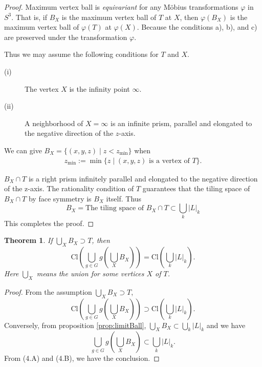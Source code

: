 \documentclass[suppldata, dvipdfmx]{interact}
\theoremstyle{plain}%
\newtheorem{theorem}{Theorem}[section]
\theoremstyle{definition}
\theoremstyle{remark}
\theoremstyle{problemstyle}
\begin{document}
\begin{proof}
 Maximum vertex ball is {\it equivariant} for any M\"obius transformations $\varphi$ in $S^3$. 
That is, if $B_X$ is the maximum vertex ball of $T$ at $X$, then $\varphi(B_X)$ is the maximum vertex ball of $\varphi(T)$ at $\varphi(X)$.
Because the conditions a), b), and c) are preserved under the transformation $\varphi$.

Thus we may assume the following conditions for $T$ and $X$.
 \begin{description}
  \item[(i)] The vertex $X$ is the infinity point $\infty$.
  \item[(ii)] A neighborhood of $X=\infty$ is an infinite prism, parallel and elongated to the negative direction of the $z$-axis.
 \end{description}
 We can give $B_X = \{(x, y, z) \mid z < z_\text{min}\}$ when
\begin{align*}
z_{\text{min}} := \min\{ z \mid (x, y, z) \text{ is a vertex of } T \}.
\end{align*}

 $B_X \cap T$ is a right prism infinitely parallel and elongated to the negative direction of the z-axis.  The rationality condition of $T$ guarantees that the tiling space of $B_X \cap T$ by face symmetry is $B_X$ itself.  Thus 
\[
B_X = \text{The tiling space of }B_X \cap T \subset \bigcup_k |L|_k
\]
This completes the proof.
\end{proof}

\begin{theorem}
If $\bigcup_{X} B_X \supset T$, then
\[
\text{Cl}\left(\bigcup_{g\in G}g(\bigcup_X {B_X})\right) = \text{Cl}\left(\bigcup_k |L|_k\right).
\]
Here $\bigcup_X$ means the union for some vertices $X$ of $T$.
\end{theorem}

\begin{proof}
  From the assumption $\bigcup_{X} B_X \supset T$, 
\[
\text{Cl}\left(\bigcup_{g\in G} g(\bigcup_X B_X)\right) 
\supset \text{Cl}(\bigcup_{k} |L|_k). \tag{4.A}
\]
 Conversely, from proposition \ref{prop:limitBall},
$\bigcup_X B_X \subset \bigcup_{k} |L|_k$ and we have
\[
\bigcup_{g\in G} g(\bigcup_X B_X)
\subset \bigcup_{k} |L|_k. \tag{4.B}
\]
From (4.A) and (4.B), we have the conclusion.
\end{proof}
\end{document}
